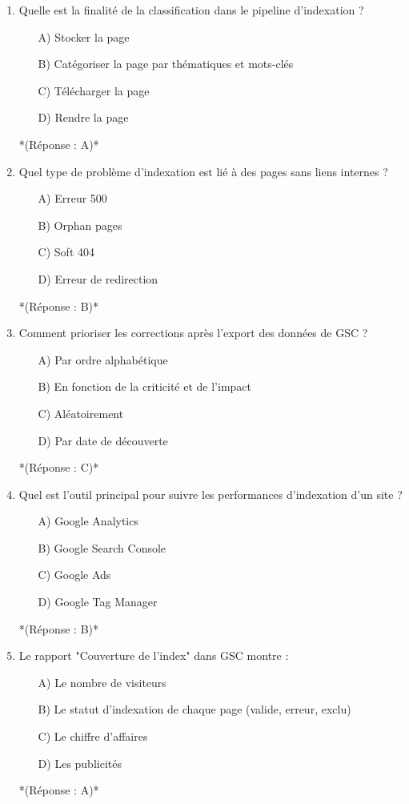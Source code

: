 \documentclass[12pt,a4paper,twoside]{report}
\begin{document}
\begin{enumerate}
\item Quelle est la finalité de la classification dans le pipeline d'indexation ?
\begin{itemize}
\item[A)] Stocker la page
\item[B)] Catégoriser la page par thématiques et mots-clés
\item[C)] Télécharger la page
\item[D)] Rendre la page
\end{itemize}
*(Réponse : A)*

\item Quel type de problème d'indexation est lié à des pages sans liens internes ?
\begin{itemize}
\item[A)] Erreur 500
\item[B)] Orphan pages
\item[C)] Soft 404
\item[D)] Erreur de redirection
\end{itemize}
*(Réponse : B)*

\item Comment prioriser les corrections après l'export des données de GSC ?
\begin{itemize}
\item[A)] Par ordre alphabétique
\item[B)] En fonction de la criticité et de l'impact
\item[C)] Aléatoirement
\item[D)] Par date de découverte
\end{itemize}
*(Réponse : C)*

\item Quel est l'outil principal pour suivre les performances d'indexation d'un site ?
\begin{itemize}
\item[A)] Google Analytics
\item[B)] Google Search Console
\item[C)] Google Ads
\item[D)] Google Tag Manager
\end{itemize}
*(Réponse : B)*

\item Le rapport "Couverture de l'index" dans GSC montre :
\begin{itemize}
\item[A)] Le nombre de visiteurs
\item[B)] Le statut d'indexation de chaque page (valide, erreur, exclu)
\item[C)] Le chiffre d'affaires
\item[D)] Les publicités
\end{itemize}
*(Réponse : A)*
\end{enumerate}
\end{document}
